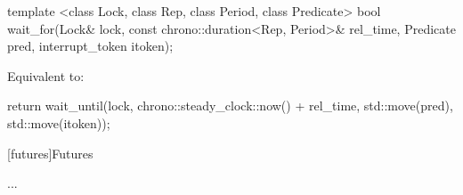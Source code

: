 {\begin{itemdecl}
template <class Lock, class Rep, class Period, class Predicate>
  bool wait_for(Lock& lock,
                const chrono::duration<Rep, Period>& rel_time,
                Predicate pred,
                interrupt_token itoken);
\end{itemdecl}
\begin{itemdescr}
 \pnum \effects Equivalent to:
\begin{codeblock}
return wait_until(lock, chrono::steady_clock::now() + rel_time, std::move(pred), std::move(itoken));
\end{codeblock}
\end{itemdescr}

}%


\vspace{5ex}

[futures]{Futures}

...

